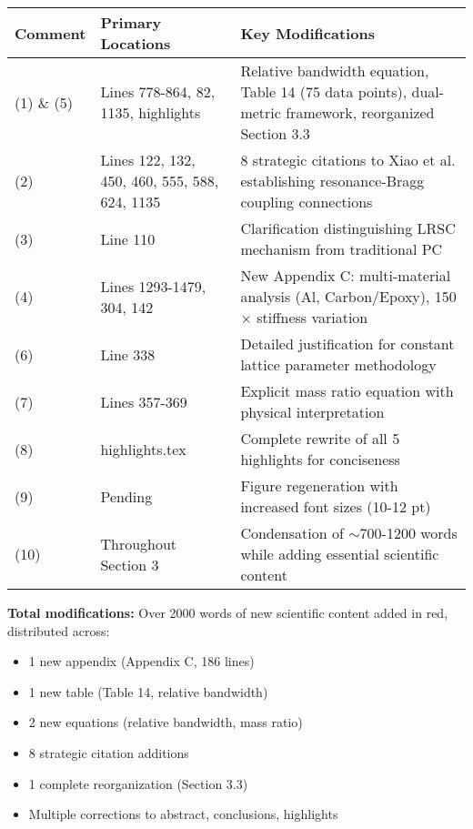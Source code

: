 \documentclass[11pt,a4paper]{article}
\begin{document}
\begin{table}[h]
\centering
\small
\begin{tabular}{|p{2cm}|p{4cm}|p{7cm}|}
\hline
\textbf{Comment} & \textbf{Primary Locations} & \textbf{Key Modifications} \\
\hline
(1) \& (5) & Lines 778-864, 82, 1135, highlights & Relative bandwidth equation, Table 14 (75 data points), dual-metric framework, reorganized Section 3.3 \\
\hline
(2) & Lines 122, 132, 450, 460, 555, 588, 624, 1135 & 8 strategic citations to Xiao et al. establishing resonance-Bragg coupling connections \\
\hline
(3) & Line 110 & Clarification distinguishing LRSC mechanism from traditional PC \\
\hline
(4) & Lines 1293-1479, 304, 142 & New Appendix C: multi-material analysis (Al, Carbon/Epoxy), 150$\times$ stiffness variation \\
\hline
(6) & Line 338 & Detailed justification for constant lattice parameter methodology \\
\hline
(7) & Lines 357-369 & Explicit mass ratio equation with physical interpretation \\
\hline
(8) & highlights.tex & Complete rewrite of all 5 highlights for conciseness \\
\hline
(9) & Pending & Figure regeneration with increased font sizes (10-12 pt) \\
\hline
(10) & Throughout Section 3 & Condensation of $\sim$700-1200 words while adding essential scientific content \\
\hline
\end{tabular}
\end{table}

\textbf{Total modifications:} Over 2000 words of new scientific content added in red, distributed across:
\begin{itemize}
    \item 1 new appendix (Appendix C, 186 lines)
    \item 1 new table (Table 14, relative bandwidth)
    \item 2 new equations (relative bandwidth, mass ratio)
    \item 8 strategic citation additions
    \item 1 complete reorganization (Section 3.3)
    \item Multiple corrections to abstract, conclusions, highlights
\end{itemize}
\end{document}
